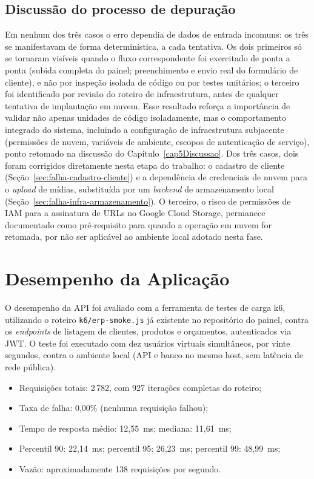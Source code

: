\subsection{Discussão do processo de depuração}

Em nenhum dos três casos o erro dependia de dados de entrada incomuns: os três se manifestavam de forma determinística, a cada tentativa. Os dois primeiros só se tornaram visíveis quando o fluxo correspondente foi exercitado de ponta a ponta (subida completa do painel; preenchimento e envio real do formulário de cliente), e não por inspeção isolada de código ou por testes unitários; o terceiro foi identificado por revisão do roteiro de infraestrutura, antes de qualquer tentativa de implantação em nuvem. Esse resultado reforça a importância de validar não apenas unidades de código isoladamente, mas o comportamento integrado do sistema, incluindo a configuração de infraestrutura subjacente (permissões de nuvem, variáveis de ambiente, escopos de autenticação de serviço), ponto retomado na discussão do Capítulo~\ref{cap5Discussao}. Dos três casos, dois foram corrigidos diretamente nesta etapa do trabalho: o cadastro de cliente (Seção~\ref{sec:falha-cadastro-cliente}) e a dependência de credenciais de nuvem para o \textit{upload} de mídias, substituída por um \textit{backend} de armazenamento local (Seção~\ref{sec:falha-infra-armazenamento}). O terceiro, o risco de permissões de IAM para a assinatura de URLs no Google Cloud Storage, permanece documentado como pré-requisito para quando a operação em nuvem for retomada, por não ser aplicável ao ambiente local adotado nesta fase.

\section{Desempenho da Aplicação}
\label{sec:desempenho}

O desempenho da API foi avaliado com a ferramenta de testes de carga k6, utilizando o roteiro \texttt{k6/\allowbreak{}erp-smoke.js} já existente no repositório do painel, contra os \textit{endpoints} de listagem de clientes, produtos e orçamentos, autenticados via JWT. O teste foi executado com dez usuários virtuais simultâneos, por vinte segundos, contra o ambiente local (API e banco no mesmo host, sem latência de rede pública).

\begin{itemize}
  \item Requisições totais: 2\,782, com 927 iterações completas do roteiro;
  \item Taxa de falha: 0,00\% (nenhuma requisição falhou);
  \item Tempo de resposta médio: 12,55~ms; mediana: 11,61~ms;
  \item Percentil 90: 22,14~ms; percentil 95: 26,23~ms; percentil 99: 48,99~ms;
  \item Vazão: aproximadamente 138 requisições por segundo.
\end{itemize}

